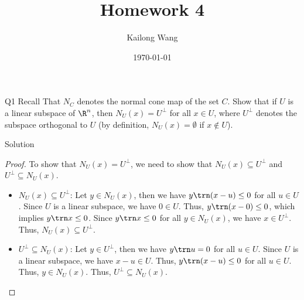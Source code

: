 \documentclass{article}
\title{Homework 4}
\author{Kailong Wang}
\date{\today}
\theoremstyle{plain}
\theoremstyle{definition}
\theoremstyle{remark}
\begin{document}
\maketitle

\begin{problem}
    {Q1}
    Recall That $N_C$ denotes the normal cone map of the set $C$. Show that if $U$ is a linear subspace of $\R^n$, then $N_U(x)=U^{\bot}$ for all $x\in U$, where $U^{\bot}$ denotes the subspace orthogonal to $U$ (by definition, $N_U(x)=\emptyset$ if $x\notin U$).
\end{problem}

\begin{solution}
    {Solution}
    \begin{proof}
        To show that $N_U(x)=U^{\bot}$, we need to show that $N_U(x)\subseteq U^{\bot}$ and $U^{\bot}\subseteq N_U(x)$.
        \begin{itemize}
            \item $N_U(x)\subseteq U^{\bot}$: {
                    Let $y\in N_U(x)$, then we have $y\trn(x-u)\leq 0$ for all $u\in U$. Since $U$ is a linear subspace, we have $0\in U$. Thus, $y\trn(x-0)\leq 0$, which implies $y\trn x\leq 0$. Since $y\trn x\leq 0$ for all $y\in N_U(x)$, we have $x\in U^{\bot}$. Thus, $N_U(x)\subseteq U^{\bot}$.
            }
            \item $U^{\bot}\subseteq N_U(x)$: {
                    Let $y\in U^{\bot}$, then we have $y\trn u=0$ for all $u\in U$. Since $U$ is a linear subspace, we have $x-u\in U$. Thus, $y\trn(x-u)\leq 0$ for all $u\in U$. Thus, $y\in N_U(x)$. Thus, $U^{\bot}\subseteq N_U(x)$.
            }
        \end{itemize}
    \end{proof}
\end{solution}
\end{document}
